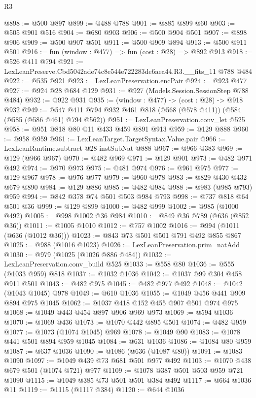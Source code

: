 \begin{lexlean}{R3}
\begin{coremodule}
@898 := @500 @897
@899 := @488 @788
@901 := @885 @899 @60
@903 := @505 @901 @516
@904 := @680 @903
@906 := @500 @904 @501
@907 := @898 @906
@909 := @500 @907 @501
@911 := @500 @909 @894
@913 := @500 @911 @501
@916 := fun (window : @477) => fun (cost : @28) => @892 @913
@918 := @526 @411 @794
@921 := LexLeanPreserve.Cbd5042ade74c8e544e722283de6aea44.R3.__fits_11 @788 @484
@922 := @535 @921
@923 := LexLeanPreservation.encPair
@924 := @923 @477
@927 := @924 @28 @684 @129
@931 := @927 (Models.Session.SessionStep @788 @484)
@932 := @922 @931
@935 := (window : @477) -> (cost : @28) -> @918 @932
@949 := @547 @411 @794 @932 @461 @818 (@568 (@578 @411)) (@584 (@585 (@586 @461) @794 @562))
@951 := LexLeanPreservation.conv_let @525
@958 := @951 @818 @80 @11 @433 @459 @891 @913
@959 := @129 @888
@960 := @958 @959
@961 := LexLeanTarget.TargetSyntax.Value.pair
@966 := LexLeanRuntime.subtract @28 instSubNat @888
@967 := @966 @383
@969 := @129 (@966 @967)
@970 := @482 @969
@971 := @129 @901
@973 := @482 @971 @492
@974 := @970 @973
@975 := @481 @974
@976 := @961 @975
@977 := @129 @967
@978 := @976 @977
@979 := @960 @978
@983 := @829 @430 @432 @679 @890
@984 := @129 @886
@985 := @482 @984
@988 := @983 (@985 @793) @959
@994 := @842 @378 @74 @501 @503 @984 @793
@998 := @737 @818 @64 @501 @36
@999 := @129 @899
@1000 := @482 @999
@1002 := @985 (@1000 @492)
@1005 := @998 @1002 @36 @984
@1010 := @849 @36 @789 (@636 (@852 @36))
@1011 := @1005 @1010
@1012 := @757 @1002
@1016 := @994 (@1011 (@636 (@1012 @36)))
@1023 := @843 @73 @501 @501 @791 @492 @855 @867
@1025 := @988 (@1016 @1023)
@1026 := LexLeanPreservation.prim_natAdd
@1030 := @979 (@1025 (@1026 @886 @484))
@1032 := LexLeanPreservation.conv_build @525
@1033 := @558 @80
@1036 := @555 (@1033 @959) @818
@1037 := @1032 @1036
@1042 := @1037 @99 @304 @458 @911 @501
@1043 := @482 @975
@1045 := @482 @977 @492
@1048 := @1042 (@1043 @1045) @978
@1049 := @610 @1036
@1055 := @1049 @456 @441 @909 @894 @975 @1045
@1062 := @1037 @418 @152 @455 @907 @501 @974 @975
@1068 := @1049 @443 @454 @897 @906 @969 @973
@1069 := @594 @1036
@1070 := @1069 @436
@1073 := @1070 @442 @895 @501
@1074 := @482 @959
@1077 := @1073 (@1074 @1045) @969
@1078 := @1049 @90
@1083 := @1078 @441 @501 @894 @959 @1045
@1084 := @631 @1036
@1086 := @1084 @80 @959
@1087 := @637 @1036
@1090 := @1086 (@636 (@1087 @80))
@1091 := @1083 @1090
@1097 := @1049 @439 @73 @681 @501 @977 @492
@1103 := @1070 @438 @679 @501 (@1074 @721) @977
@1109 := @1078 @387 @501 @503 @959 @721 @1090
@1115 := @1049 @385 @73 @501 @501 @384 @492
@1117 := @664 @1036 @11
@1119 := @1115 (@1117 @384)
@1120 := @644 @1036

\end{coremodule}
\end{lexlean}
